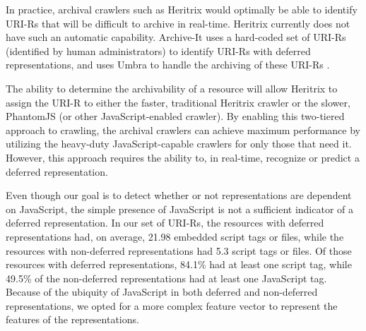\documentclass{ipres_proc_article-sp}
\begin{document}
In practice, archival crawlers such as Heritrix would optimally be able to identify URI-Rs that will be difficult to archive in real-time. Heritrix currently does not have such an automatic capability. Archive-It uses a hard-coded set of URI-Rs (identified by human administrators) to identify URI-Rs with deferred representations, and uses Umbra to handle the archiving of these URI-Rs \cite{umbra}.

The ability to determine the archivability of a resource will allow Heritrix to assign the URI-R to either the faster, traditional Heritrix crawler or the slower,  PhantomJS (or other JavaScript-enabled crawler). By enabling this two-tiered approach to crawling, the archival crawlers can achieve maximum performance by utilizing the heavy-duty JavaScript-capable crawlers for only those that need it. However, this approach requires the ability to, in real-time, recognize or predict a deferred representation.


Even though our goal is to detect whether or not representations are dependent on JavaScript, the simple presence of JavaScript is not a sufficient indicator of a deferred representation. In our set of URI-Rs, the resources with deferred representations had, on average, 21.98 embedded script tags or files, while the resources with non-deferred representations had 5.3 script tags or files. Of those resources with deferred representations, 84.1\% had at least one script tag, while 49.5\% of the non-deferred representations had at least one JavaScript tag. Because of the ubiquity of JavaScript in both deferred and non-deferred representations, we opted for a more complex feature vector to represent the features of the representations.
\end{document}
